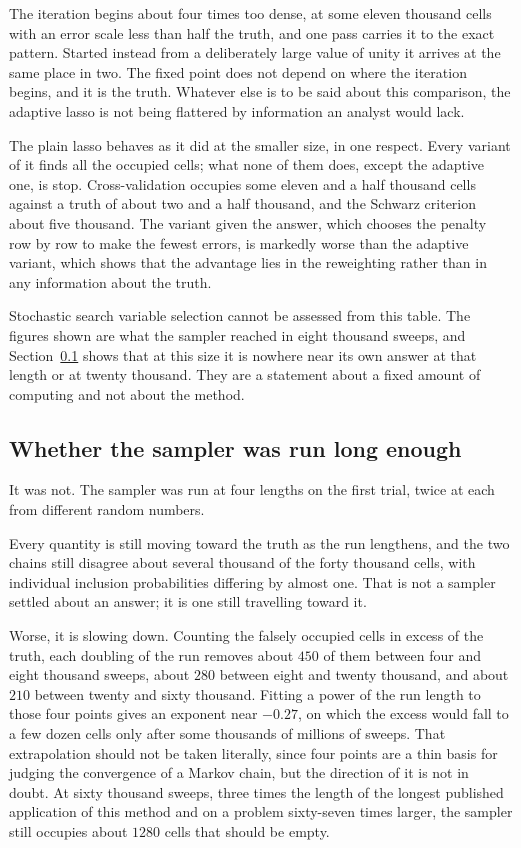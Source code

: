 

The iteration begins about four times too dense, at some eleven thousand cells with
an error scale less than half the truth, and one pass carries it to the exact
pattern. Started instead from a deliberately large value of unity it arrives at the
same place in two. The fixed point does not depend on where the iteration begins, and
it is the truth. Whatever else is to be said about this comparison, the adaptive
lasso is not being flattered by information an analyst would lack.

The plain lasso behaves as it did at the smaller size, in one respect. Every variant
of it finds all the occupied cells; what none of them does, except the adaptive one,
is stop. Cross-validation occupies some eleven and a half thousand cells against a
truth of about two and a half thousand, and the Schwarz criterion about five
thousand. The variant given the answer, which chooses the penalty row by row to make
the fewest errors, is markedly worse than the adaptive variant, which shows that the
advantage lies in the reweighting rather than in any information about the truth.

Stochastic search variable selection cannot be assessed from this table. The figures
shown are what the sampler reached in eight thousand sweeps, and
Section~\ref{sec:mixing} shows that at this size it is nowhere near its own answer at
that length or at twenty thousand. They are a statement about a fixed amount of
computing and not about the method.

\subsection{Whether the sampler was run long enough}
\label{sec:mixing}

It was not. The sampler was run at four lengths on the first trial, twice at each
from different random numbers.



Every quantity is still moving toward the truth as the run lengthens, and the two
chains still disagree about several thousand of the forty thousand cells, with
individual inclusion probabilities differing by almost one. That is not a sampler
settled about an answer; it is one still travelling toward it.

Worse, it is slowing down. Counting the falsely occupied cells in excess of the
truth, each doubling of the run removes about $450$ of them between four and eight
thousand sweeps, about $280$ between eight and twenty thousand, and about $210$
between twenty and sixty thousand. Fitting a power of the run length to those four
points gives an exponent near $-0.27$, on which the excess would fall to a few dozen
cells only after some thousands of millions of sweeps. That extrapolation should not
be taken literally, since four points are a thin basis for judging the convergence of
a Markov chain, but the direction of it is not in doubt. At sixty thousand sweeps,
three times the length of the longest published application of this method and on a
problem sixty-seven times larger, the sampler still occupies about $1280$ cells that
should be empty.

